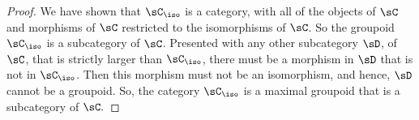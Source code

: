 \documentclass[main.tex]{subfiles}
\begin{document}
\begin{proof}
	We have shown that \(\sC_\iso\) is a category, with all of the objects of
	\(\sC\) and morphisms of \(\sC\) restricted to the isomorphisms of
	\(\sC\). So the groupoid \(\sC_\iso\) is a
	subcategory of \(\sC\). Presented with any other subcategory \(\sD\), of \(\sC\), that is
	strictly larger than \(\sC_\iso\), there must be a morphism in \(\sD\) that is
	not in \(\sC_\iso\). Then this morphism must not be an isomorphism, and
	hence, \(\sD\) cannot be a groupoid. So, the category \(\sC_\iso\) is a maximal
	groupoid that is a subcategory of \(\sC.\)
\end{proof}
\end{document}
